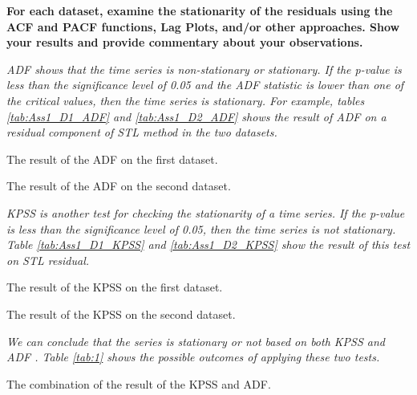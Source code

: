 \item \textbf{For each dataset, examine the stationarity of the residuals using the ACF and PACF functions, Lag Plots, and/or other approaches. Show your results and provide commentary about your observations.}

\textit{\gls{ADF} shows that the time series is non-stationary or stationary. If the p-value is less than the significance level of 0.05 and the \gls{ADF} statistic is lower than one of the critical values, then the time series is stationary. For example, tables \ref{tab:Ass1_D1_ADF} and \ref{tab:Ass1_D2_ADF} shows the result of \gls{ADF} on a residual component of STL method in the two datasets.}

\begin{table}[H]
\centering
\caption{The result of the \gls{ADF} on the first dataset.}
\label{tab:Ass1_D1_ADF}

\end{table}

\begin{table}[H]
\centering
\caption{The result of the \gls{ADF} on the second dataset.}
\label{tab:Ass1_D2_ADF}

\end{table}



\textit{\gls{KPSS} is another test for checking the stationarity of a time series. If the p-value is less than the significance level of 0.05, then the time series is not stationary. Table \ref{tab:Ass1_D1_KPSS} and \ref{tab:Ass1_D2_KPSS} show the result of this test on STL residual.}

\begin{table}[H]
\centering
\caption{The result of the \gls{KPSS} on the first dataset.}
\label{tab:Ass1_D1_KPSS}

\end{table}

\begin{table}[H]
\centering
\caption{The result of the \gls{KPSS} on the second dataset.}
\label{tab:Ass1_D2_KPSS}

\end{table}

\textit{We can conclude that the series is stationary or not based on both \gls{KPSS} and \gls{ADF} \cite{StationarityStatsmodels}. Table \ref{tab:1} shows the possible outcomes of applying these two tests.}

\begin{table}[H]
\centering
\caption{The combination of the result of the \gls{KPSS} and \gls{ADF}.}
\label{tab:1}

\end{table}



